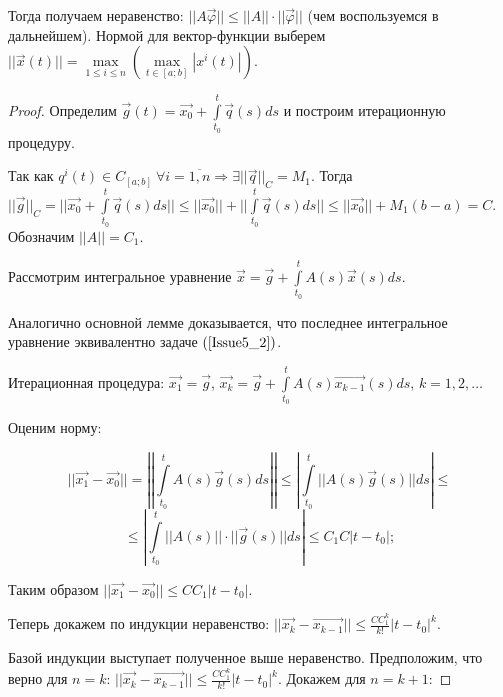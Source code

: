 Тогда получаем неравенство: $||A \overrightarrow{\varphi}|| \leqslant ||A|| \cdot ||\overrightarrow{\varphi}||$ (чем воспользуемся в дальнейшем).
Нормой для вектор-функции выберем $||\overrightarrow{x}(t)|| = \max\limits_{1 \leqslant i \leqslant n} (\max\limits_{t \in [a;b]} |x^i(t)|)$.

\begin{proof}

Определим $\overrightarrow{g}(t) = \overrightarrow{x_0} + \int\limits_{t_0}^{t} \overrightarrow{q}(s)ds$ и построим итерационную процедуру.

Так как $q^i(t) \in C_{[a;b]}\ \forall i = \overline{1, n} \Rightarrow \exists ||\overrightarrow{q}||_C = M_1.$ Тогда $||\overrightarrow{g}||_C = \Big| \Big|\overrightarrow{x_0} + \int\limits_{t_0}^{t}\overrightarrow{q}(s)ds \Big| \Big| \leqslant ||\overrightarrow{x_0}|| + \Big| \Big| \int\limits_{t_0}^{t}\overrightarrow{q}(s)ds \Big| \Big| \leqslant ||\overrightarrow{x_0}|| + M_1(b-a) = C$. Обозначим $||A|| = C_1$.

Рассмотрим интегральное уравнение $\overrightarrow{x} = \overrightarrow{g} + \int\limits_{t_0}^{t}A(s)\overrightarrow{x}(s)ds$.

Аналогично основной лемме доказывается, что последнее интегральное уравнение эквивалентно задаче $(\ref{Issue5_2})$.

Итерационная процедура: $\overrightarrow{x_1} = \overrightarrow{g}$, $\overrightarrow{x_k} = \overrightarrow{g} + \int\limits_{t_0}^{t} A(s)\overrightarrow{x_{k-1}}(s)ds $, $k = 1, 2, \dots$

Оценим норму:

$$ ||\overrightarrow{x_1} - \overrightarrow{x_0}|| = \left| \left| \int\limits_{t_0}^{t} A(s)\overrightarrow{g}(s)ds \right| \right| \leqslant \left| \int\limits_{t_0}^{t} || A(s)\overrightarrow{g}(s) || ds \right| \leqslant $$
$$\leqslant \left| \int\limits_{t_0}^{t} || A(s) || \cdot || \overrightarrow{g}(s) || ds \right| \leqslant C_1 C |t - t_0|;$$ 

Таким образом $||\overrightarrow{x_1} -\overrightarrow{x_0}|| \leqslant CC_1|t-t_0|.$

Теперь докажем по индукции неравенство: $||\overrightarrow{x_k} - \overrightarrow{x_{k-1}}|| \leqslant \frac{CC_1^k}{k!}|t-t_0|^k.$

Базой индукции выступает полученное выше неравенство. Предположим, что верно для $n = k$: $||\overrightarrow{x_k} - \overrightarrow{x_{k-1}}|| \leqslant \frac{CC_1^k}{k!}|t-t_0|^k$. Докажем для $n = k + 1$:


\end{proof}
